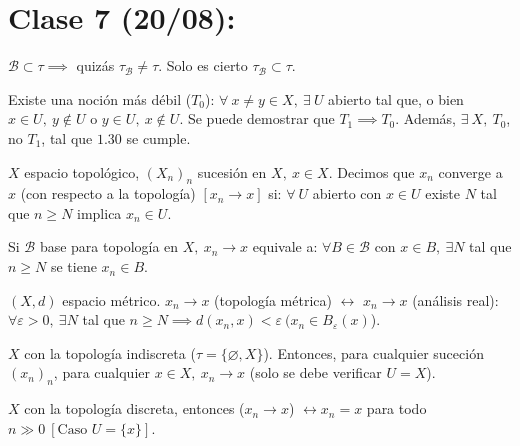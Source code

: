 
	\section{Clase 7 (20/08): }

	\begin{remark}
		$\mathcal{B} \subset \tau \implies$ quizás $\tau_{\mathcal{B}} \neq \tau$. Solo es cierto $\tau_{\mathcal{B}} \subset \tau$.
	\end{remark}

	\begin{remark}
		Existe una noción más débil ($T_0$): $\forall \ x \neq y \in X,\ \exists \ U$ abierto tal que, o bien $x \in U,\ y \not\in U$ o $y \in U,\ x \not\in U$. Se puede demostrar que $T_1 \implies T_0$. Además, $\exists\ X,\ T_0$, no $T_1$, tal que $1.30$ se cumple.
	\end{remark}

	\begin{definition}
		$X$ espacio topológico, $(X_n)_n$ sucesión en $X,\ x \in X$. Decimos que $x_n$ converge a $x$ (con respecto a la topología) $[x_n \to x]$ si: $\forall \ U$ abierto con $x\in U$ existe $N$ tal que $n\geq N$ implica $x_n \in U$.
	\end{definition}

	\begin{note}
		Si $\mathcal{B}$ base para topología en $X,\ x_n \to x$ equivale a: $\forall B \in \mathcal{B}$ con $x \in B, \ \exists N$ tal que $n\geq N$ se tiene $x_n \in B$.
	\end{note}

	\begin{eg}
		$(X,d)$ espacio métrico. $x_n \to x$ (topología métrica) $\longleftrightarrow$ $x_n \to x$ (análisis real): $\forall \varepsilon > 0,\ \exists N$ tal que $n \geq N \implies d(x_n,x)<\varepsilon \ (x_n \in B_{\varepsilon} (x)$). 
	\end{eg}

	\begin{eg}
		$X$ con la topología indiscreta ($\tau = \{\varnothing, X\}$). Entonces, para cualquier suceción $(x_n)_n$, para cualquier $x \in X, \ x_n \to x$ (solo se debe verificar $U = X$).  
	\end{eg}

	\begin{eg}
		$X$ con la topología discreta, entonces ($x_n \to x$) $\longleftrightarrow x_n = x$ para todo $n\gg 0 \ [\text{Caso } U=\{x\}]$. 
	\end{eg}

